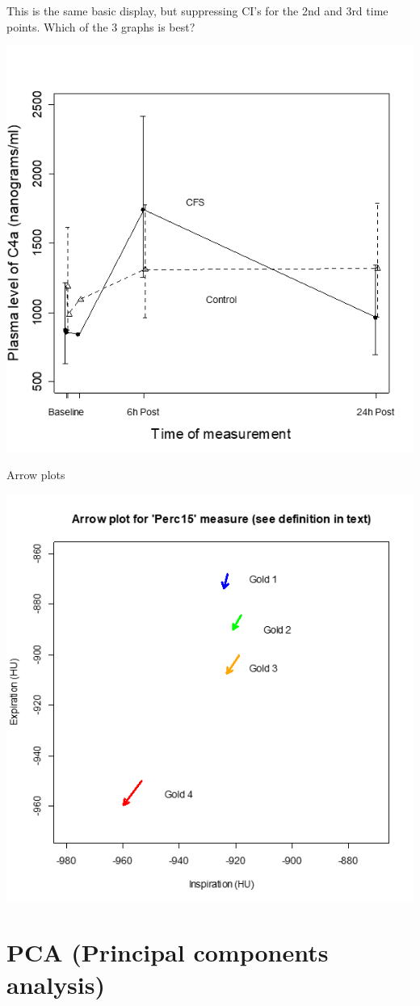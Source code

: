 \documentclass[
  9pt,
  ignorenonframetext,
]{beamer}
\begin{document}
\begin{frame}{}
\protect\hypertarget{section-10}{}
This is the same basic display, but suppressing CI's for the 2nd and 3rd
time points. Which of the 3 graphs is best?

\tiny

\begin{center}\includegraphics[width=0.6\linewidth]{figs_L2/L2-f15} \end{center}

\tiny
\end{frame}

\begin{frame}{Arrow plots}
\protect\hypertarget{arrow-plots}{}
\tiny

\begin{center}\includegraphics[width=0.6\linewidth]{figs_L2/L2-f17} \end{center}

\tiny
\end{frame}

\hypertarget{pca-principal-components-analysis}{%
\section{PCA (Principal components
analysis)}\label{pca-principal-components-analysis}}
\end{document}
